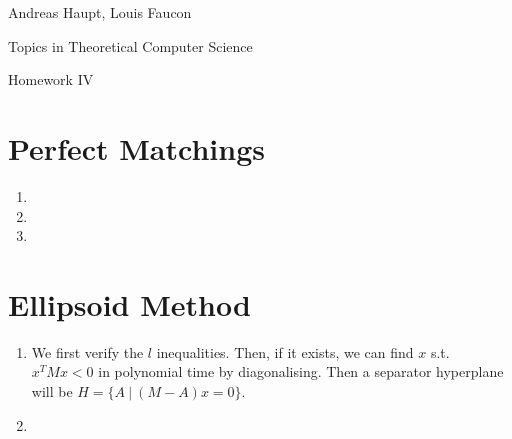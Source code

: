 \documentclass{scrartcl}
\newcommand\1{\mathbf{1}}
\begin{document}
Andreas Haupt, Louis Faucon

Topics in Theoretical Computer Science 

Homework IV


\section{Perfect Matchings}
\begin{enumerate}
\item
\item
\item
\end{enumerate}

\section{Ellipsoid Method}
\begin{enumerate}
\item
We first verify the $l$ inequalities. Then, if it exists, we can find $x$ s.t. $x^T M x < 0$ in polynomial time by diagonalising. Then a separator hyperplane will be $H = \{A\ |\ (M-A) x = 0\}$. 

\item


\end{enumerate}
\end{document}
